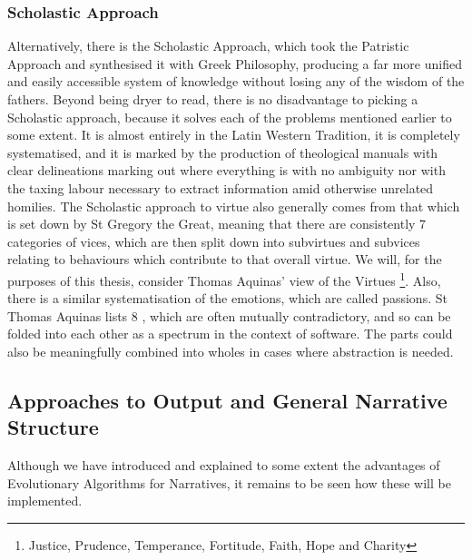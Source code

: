 \documentclass[12pt]{article}
\begin{document}
\subsubsection{Scholastic Approach} 
Alternatively, there is the Scholastic Approach, which took the Patristic Approach and synthesised it with Greek Philosophy, producing a far more unified and easily accessible system of knowledge without losing any of the wisdom of the fathers. Beyond being dryer to read, there is no disadvantage to picking a Scholastic approach, because it solves each of the problems mentioned earlier to some extent. It is almost entirely in the Latin Western Tradition, it is completely systematised, and it is marked by the production of theological manuals with clear delineations marking out where everything is with no ambiguity nor with the taxing labour necessary to extract information amid otherwise unrelated homilies. The Scholastic approach to virtue also generally comes from that which is set down by St Gregory the Great, meaning that there are consistently 7 categories of vices, which are then split down into subvirtues and subvices relating to behaviours which contribute to that overall virtue. We will, for the purposes of this thesis, consider Thomas Aquinas' view of the Virtues \footnote{Justice, Prudence, Temperance, Fortitude, Faith, Hope and Charity}. Also, there is a similar systematisation of the emotions, which are called passions. St Thomas Aquinas lists 8 \cite{ThomasAq85:online}, which are often mutually contradictory, and so can be folded into each other as a spectrum in the context of software. The parts could also be meaningfully combined into wholes in cases where abstraction is needed.
\subsection{Approaches to Output and General Narrative Structure}
Although we have introduced and explained to some extent the advantages of Evolutionary Algorithms for Narratives, it remains to be seen how these will be implemented. 
\end{document}
